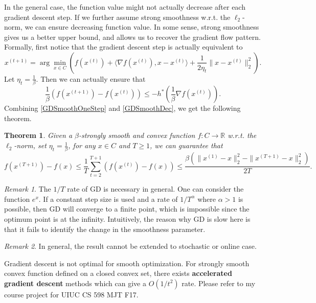\documentclass[openany]{book}
\newtheorem{theorem}{Theorem}[chapter]
\theoremstyle{definition}
\theoremstyle{remark}
\newtheorem*{remark}{Remark}
\begin{document}
In the general case, the function value might not actually decrease after each gradient descent step. If we further assume strong smoothness w.r.t. the $\ell_2$-norm, we can ensure decreasing function value. In some sense, strong smoothness gives us a better upper bound, and allows us to recover the gradient flow pattern. Formally, first notice that the gradient descent step is actually equivalent to
\begin{equation}\label{quadApprox}
    x^{(t+1)}=\arg\min_{x\in C}\left(f(x^{(t)})+\langle\nabla f(x^{(t)}),x-x^{(t)}\rangle+\frac{1}{2\eta_t}\|x-x^{(t)}\|_2^2\right).
\end{equation}
Let $\eta_t=\frac{1}{\beta}$. Then we can actually ensure that
\begin{equation}\label{GDSmoothDec}
    \frac{1}{\beta}\left(f(x^{(t+1)})-f(x^{(t)})\right)\le-h^*\left(\frac{1}{\beta}\nabla f(x^{(t)})\right).
\end{equation}
Combining \eqref{GDSmoothOneStep} and \eqref{GDSmoothDec}, we get the following theorem.
\begin{theorem}
    Given a $\beta$-strongly smooth and convex function $f:C\to \mathbb{R}$ w.r.t. the $\ell_2$-norm, set $\eta_t=\frac{1}{\beta}$, for any $x\in C$ and $T\ge1$, we can guarantee that
    \begin{equation*}
        f(x^{(T+1)})-f(x)\le\frac{1}{T}\sum_{t=2}^{T+1}\left(f(x^{(t)})-f(x)\right)\le \frac{\beta\left(\|x^{(1)}-x\|_2^2-\|x^{(T+1)}-x\|_2^2\right)}{2T}.
    \end{equation*}
\end{theorem}
\begin{remark}
    The $1/T$ rate of GD is necessary in general. One can consider the function $e^x$. If a constant step size is used and a rate of $1/T^{\alpha}$ where $\alpha>1$ is possible, then GD will converge to a finite point, which is impossible since the optimum point is at the infinity. Intuitively, the reason why GD is slow here is that it fails to identify the change in the smoothness parameter.
\end{remark}
\begin{remark}
    In general, the result cannot be extended to stochastic or online case.
\end{remark}

Gradient descent is not optimal for smooth optimization. For strongly smooth convex function defined on a closed convex set, there exists \textbf{accelerated gradient descent} methods which can give a $O(1/t^2)$ rate. Please refer to my course project for UIUC CS 598 MJT F17.
\end{document}

